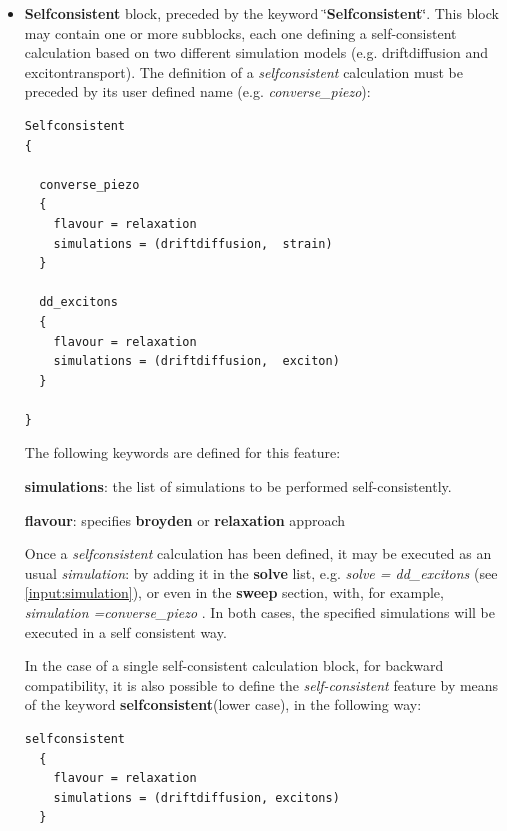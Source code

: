 \begin{itemize}
  \item \textbf{Selfconsistent} block, preceded by the keyword \char`\"{}\textbf{Selfconsistent}\char`\"{}. This block  may contain  one or  more subblocks, each one  defining a  self-consistent calculation based on two different simulation models (e.g. driftdiffusion and excitontransport).
The definition of  a \textit{selfconsistent} calculation   must be preceded by   its  user defined  name (e.g. \textit{converse\_piezo}): 




\begin{inputfile}
\begin{verbatim}
Selfconsistent
{

  converse_piezo
  {
    flavour = relaxation
    simulations = (driftdiffusion,  strain)
  }

  dd_excitons
  {
    flavour = relaxation
    simulations = (driftdiffusion,  exciton)
  }

}

\end{verbatim}
\caption{Example of  \textbf{Selfconsistent} section }
\label{input:selfcons}
\end{inputfile}

The following  keywords  are  defined  for  this  feature:

\textbf{simulations}:  the  list of  simulations to  be  performed self-consistently.

\textbf{flavour}:   specifies  \textbf{broyden} or  \textbf{relaxation} approach  

Once a \textit{selfconsistent} calculation has  been  defined, it may be  executed as an usual  \textit{simulation}:
%
%
by adding it in the 
\textbf{solve}  list,  e.g.  \textit{solve = dd\_excitons }  (see \ref{input:simulation}),    or  even  in  the  \textbf{sweep} section,  with, for  example,  
 \textit{simulation =converse\_piezo }.
In  both  cases, the  specified  simulations will  be  executed in a self  consistent  way.


In the  case of  a  single  self-consistent calculation   block, for backward compatibility, it is  also  possible   to define  the  \textit{self-consistent }  feature by  means of  the  keyword \textbf{selfconsistent}(lower case),  in  the  following  way: 
\begin{verbatim}
selfconsistent
  {
    flavour = relaxation
    simulations = (driftdiffusion, excitons)
  }
\end{verbatim}




\end{itemize}

